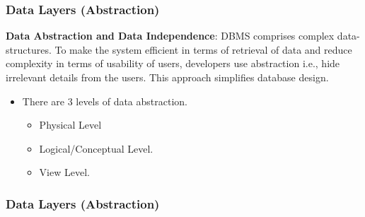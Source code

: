 \begin{frame}
	\frametitle{Data Layers (Abstraction)}
	\begin{definition}
		\textbf{Data Abstraction and Data Independence}: DBMS comprises complex data-structures. To make the system efficient in terms of retrieval of data and reduce complexity in terms of usability of users, developers use abstraction i.e., hide irrelevant details from the users. This approach simplifies database design.
	\end{definition}	
	\begin{itemize}[<+->]
		\item There are 3 levels of data abstraction.
		\begin{itemize}[<+->]
			\item Physical Level
			\item Logical/Conceptual Level.
			\item View Level.
		\end{itemize}
	\end{itemize}	
\end{frame}
\begin{frame}
\frametitle{Data Layers (Abstraction)}

\end{frame}
\VideoClassification
